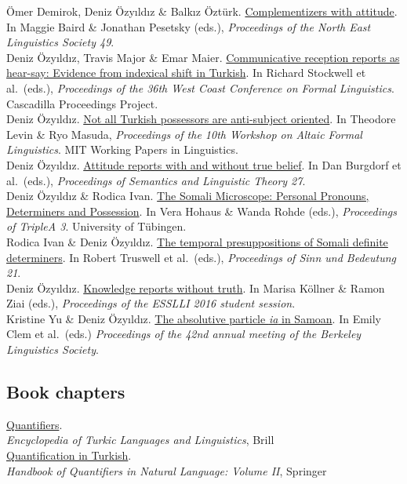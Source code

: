 \documentclass[11pt, a4paper]{article} %
\newcommand{\years}[1]{\marginnote{\scriptsize #1}} %
\newcommand{\me}{Deniz \"Ozy\i{}ld\i{}z}
\newcommand{\btit}{\textit}
\begin{document}
\years{} \"Omer Demirok, Deniz \"Ozy\i{}ld\i{}z \& Balk\i{}z \"Ozt\"urk. \href{http://deniz.fr/pdfs/2018-nels-paper.pdf}{Complementizers with attitude}. In Maggie Baird \& Jonathan Pesetsky (eds.), \btit{Proceedings of the North East Linguistics Society 49}.\\[.25em]
\years{2018} \me, Travis Major \& Emar Maier. \href{http://deniz.fr/pdfs/2018-wccfl-paper.pdf}{Communicative reception reports as hear-say: Evidence from indexical shift in Turkish}. In Richard Stockwell et al.\ (eds.), %
\btit{Proceedings of the 36th West Coast Conference on Formal Linguistics}. Cascadilla Proceedings Project.\\[.25em]
\me. \href{http://deniz.fr/pdfs/possessives_paper.pdf}{Not all Turkish possessors are anti-subject oriented}. In Theodore Levin \& Ryo Masuda, \btit{Proceedings of the 10th Workshop on Altaic Formal Linguistics}. MIT Working Papers in Linguistics.\\[.25em]
\years{2017} \me. \href{https://journals.linguisticsociety.org/proceedings/index.php/SALT/article/view/27.397/3886}{Attitude reports with and without true belief}. In Dan Burgdorf et al.\ (eds.), %
\btit{Proceedings of Semantics and Linguistic Theory 27}.\\[.25em]
\me{} \& Rodica Ivan.  \href{http://deniz.fr/pdfs/2017-ozyildiz-ivan-aaa.pdf}{The Somali Microscope: Personal Pronouns, Determiners and Possession}. In Vera Hohaus \& Wanda Rohde (eds.), \btit{Proceedings of TripleA 3}. University of T\"ubingen. \\[.25em]
Rodica Ivan \& Deniz \"Ozy\i{}ld\i{}z. \href{http://deniz.fr/pdfs/2017-ivan-ozyildiz-sub.pdf}{The temporal presuppositions of Somali definite determiners}. In Robert Truswell et al.\ (eds.), \btit{Proceedings of Sinn und Bedeutung 21}. \\[.25em]
\years{2016} \me.  \href{http://deniz.fr/pdfs/2016-esslli.pdf}{Knowledge reports without truth}. In Marisa K\"ollner \& Ramon Ziai (eds.), \btit{Proceedings of  the ESSLLI 2016 student session}.\\[.25em]
Kristine Yu \& Deniz \"Ozy\i{}ld\i{}z.  \href{http://deniz.fr/pdfs/2016-yu-ozyildiz-bls.pdf}{The absolutive particle \textit{ia} in Samoan}. In Emily Clem et al.\ (eds.) \btit{Proceedings of the 42nd annual meeting of the Berkeley Linguistics Society}.

\subsection*{Book chapters}
\years{2023}
\href{https://deniz.fr/pdfs/2020-ozyildiz-etll-v41.pdf}{Quantifiers}. \\ 
\btit{Encyclopedia of Turkic Languages and Linguistics}, Brill \\
\years{2017} \href{http://deniz.fr/pdfs/quantifiers_draft.pdf}{Quantification in
Turkish}. \\ 
\btit{Handbook of Quantifiers in Natural Language: Volume II}, Springer
\end{document}
